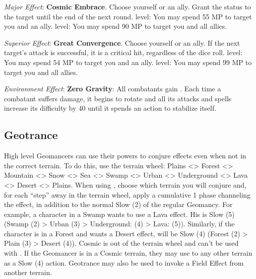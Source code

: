 \begin{multicols}{2}
\textit{Major Effect}: \textbf{Cosmic Embrace}. Choose yourself or an ally. Grant the  status to the target until the end of the next round.  level: You may spend 55 MP to target you and an ally.  level: You may spend 90 MP to target you and all allies.

\textit{Superior Effect}: \textbf{Great Convergence}. Choose yourself or an ally. If the next target’s attack is successful, it is a critical hit, regardless of the dice roll.  level: You may spend 54 MP to target you and an ally.  level: You may spend 99 MP to target you and all allies.

\textit{Environment Effect}: \textbf{Zero Gravity}: All combatants gain . Each time a combatant suffers damage, it begins to rotate and all its attacks and spells increase its difficulty by 40 until it spends an action to stabilize itself.

\end{multicols}
 
\subsection*{Geotrance}\label{subsec:geo-trance}

\begin{multicols}{2}


High level Geomancers can use their powers to conjure effects even when not in the correct terrain. To do this, use the terrain wheel: Plains <> Forest <> Mountain <> Snow <> Sea <> Swamp <> Urban <> Underground <> Lava <> Desert <> Plains. When using , choose which terrain you will conjure and, for each “step” away in the terrain wheel, apply a cumulative 1 phase channeling the effect, in addition to the normal Slow (2) of the regular Geomancy. For example, a character in a Swamp wants to use a Lava effect. His  is Slow (5) (Swamp (2) > Urban (3) > Underground: (4) > Lava: (5)). Similarly, if the character is in a Forest and wants a Desert effect,  will be Slow (4) (Forest (2) > Plain (3) > Desert (4)). Cosmic is out of the terrain wheel and can’t be used with . If the Geomancer is in a Cosmic terrain, they may use  to any other terrain as a Slow (4) action. Geotrance may also be used to invoke a Field Effect from another terrain.


\begin{center}
\end{center}
\end{multicols}
